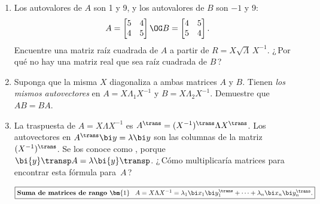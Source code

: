 \begin{enumerate}
\item Los autovalores de $A$ son 1 y 9, y los autovalores de $B$  son $-1$ y 9:
\begin{displaymath}
  A=\begin{bmatrix} 5&4\\ 4&5\end{bmatrix}\OG
  B=\begin{bmatrix} 4&5\\ 5&4\end{bmatrix}.
\end{displaymath}
Encuentre una matriz raíz cuadrada de $A$ a partir de $R=X\sqrt{\Lambda}\,X^{-1}$. ¿\,Por qué no hay una matriz real que sea raíz cuadrada de $B$\,?

\item Suponga que la misma $X$ diagonaliza a ambas matrices $A$ y  $B$. Tienen \emph{los mismos autovectores} en $A=X\Lambda_1 X^{-1}$ y $B=X\Lambda_2 X^{-1}$. Demuestre que $AB=BA$.

\item La traspuesta de $A=X\Lambda X^{-1}$ es $A^{\trans}=(X^{-1})^{\trans}\Lambda X^{\trans}$. Los autovectores en $A^{\trans} \bi y=\lambda \bi y$ son las columnas de la matriz $(X^{-1})^\trans$. Se los conoce como , porque $\bi{y}\transp A=\lambda\bi{y}\transp$. ¿\,Cómo multiplicaría matrices para encontrar esta fórmula para~$A$\,?

\vspace{-5pt}
\begin{displaymath}
\setlength{\fboxrule}{0.5pt}
\fbox{$
\hbox{\bf Suma de matrices de rango $\bm{1}$}\quad
A=X\Lambda X^{-1}=\lambda_1\bi x_1\bi y^{\trans}_1+\cdots+\lambda_n\bi x_n\bi
y^{\trans}_n.$}
\end{displaymath}


\end{enumerate}
